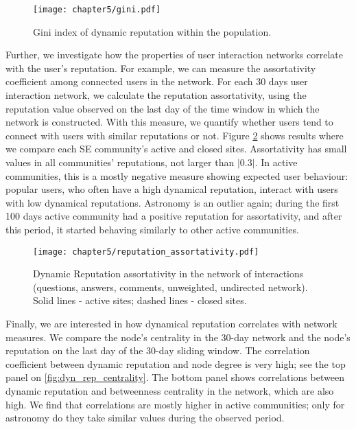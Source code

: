\begin{figure}[h]
	\centering
	\texttt{[image: chapter5/gini.pdf]}
	\caption[Gini index of dynamic reputation]{Gini index of dynamic reputation within the population.}
	\label{fig:dynrep-gini}
\end{figure} 

Further, we investigate how the properties of user interaction networks correlate with the user’s reputation. For example, we can measure the assortativity coefficient among connected users in the network. For each 30 days user interaction network, we calculate the reputation assortativity, using the reputation value observed on the last day of the time window in which the network is constructed. With this measure, we quantify whether users tend to connect with users with similar reputations or not. Figure \ref{fig:dyn_rep_assort} shows results where we compare each SE community’s active and closed sites. Assortativity has small values in all communities’ reputations, not larger than $|0.3|$. In active communities, this is a mostly negative measure showing expected user behaviour: popular users, who often have a high dynamical reputation, interact with users with low dynamical reputations. Astronomy is an outlier again; during the first 100 days active community had a positive reputation for assortativity, and after this period, it started behaving similarly to other active communities. 

\begin{figure}[h]
	\centering
	\texttt{[image: chapter5/reputation\_assortativity.pdf]}
	\caption[Dynamic Reputation assortativity]{Dynamic Reputation assortativity in the network of interactions (questions, answers, comments, unweighted, undirected network). Solid lines - active sites; dashed lines - closed sites.}
	\label{fig:dyn_rep_assort}
\end{figure}

Finally, we are interested in how dynamical reputation correlates with network measures. We compare the node’s centrality in the 30-day network and the node’s reputation on the last day of the 30-day sliding window. The correlation coefficient between dynamic reputation and node degree is very high; see the top panel on \ref{fig:dyn_rep_centrality}. The bottom panel shows correlations between dynamic reputation and betweenness centrality in the network, which are also high. We find that correlations are mostly higher in active communities; only for astronomy do they take similar values during the observed period. 

